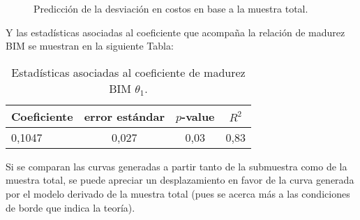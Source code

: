 \begin{figure}[H]
    \centering
    \caption{Predicción de la desviación en costos en base a la muestra total.}
\end{figure}

Y las estadísticas asociadas al coeficiente que acompaña la relación de madurez BIM se muestran en la siguiente Tabla:

\begin{table}[H]
    \centering
    \label{tab.est}
    \caption{Estadísticas asociadas al coeficiente de madurez BIM $\theta_1$.}
    \begin{tabular}{lccc}
        \toprule
        Coeficiente & error estándar & $p$-value & $R^2$\\
        \midrule
        0,1047 & 0,027 & 0,03 & 0,83\\  
        \bottomrule        
    \end{tabular}
\end{table}

Si se comparan las curvas generadas a partir tanto de la submuestra como de la muestra total, se puede apreciar un desplazamiento en favor de la curva generada por el modelo derivado de la muestra total (pues se acerca más a las condiciones de borde que indica la teoría).

